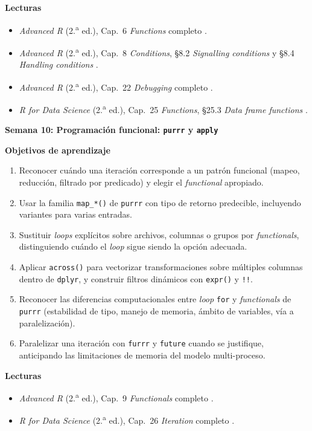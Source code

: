 \documentclass[11pt,letterpaper]{article}
\newcommand{\semana}[2]{%
  \bigskip%
  {\color{main}\Large\bfseries Semana #1: #2\par}%
  \smallskip%
}
\begin{document}
\medskip
\noindent\textbf{Lecturas}
\begin{itemize}[leftmargin=*, itemsep=1pt]
    \item \textit{Advanced R} (2.\textsuperscript{a} ed.), Cap.\ 6 \textit{Functions} completo \cite{wickham2019advr}.
    \item \textit{Advanced R} (2.\textsuperscript{a} ed.), Cap.\ 8 \textit{Conditions}, §8.2 \textit{Signalling conditions} y §8.4 \textit{Handling conditions} \cite{wickham2019advr}.
    \item \textit{Advanced R} (2.\textsuperscript{a} ed.), Cap.\ 22 \textit{Debugging} completo \cite{wickham2019advr}.
    \item \textit{R for Data Science} (2.\textsuperscript{a} ed.), Cap.\ 25 \textit{Functions}, §25.3 \textit{Data frame functions} \cite{wickham2023r4ds}.
\end{itemize}

\semana{10}{Programación funcional: \texttt{purrr} y \texttt{apply}}

\medskip
\noindent\textbf{Objetivos de aprendizaje}
\begin{enumerate}[leftmargin=*, itemsep=1pt]
    \item Reconocer cuándo una iteración corresponde a un patrón funcional (mapeo, reducción, filtrado por predicado) y elegir el \textit{functional} apropiado.
    \item Usar la familia \texttt{map\_*()} de \texttt{purrr} con tipo de retorno predecible, incluyendo variantes para varias entradas.
    \item Sustituir \textit{loops} explícitos sobre archivos, columnas o grupos por \textit{functionals}, distinguiendo cuándo el \textit{loop} sigue siendo la opción adecuada.
    \item Aplicar \texttt{across()} para vectorizar transformaciones sobre múltiples columnas dentro de \texttt{dplyr}, y construir filtros dinámicos con \texttt{expr()} y \texttt{!!}.
    \item Reconocer las diferencias computacionales entre \textit{loop} \texttt{for} y \textit{functionals} de \texttt{purrr} (estabilidad de tipo, manejo de memoria, ámbito de variables, vía a paralelización).
    \item Paralelizar una iteración con \texttt{furrr} y \texttt{future} cuando se justifique, anticipando las limitaciones de memoria del modelo multi-proceso.
\end{enumerate}

\medskip
\noindent\textbf{Lecturas}
\begin{itemize}[leftmargin=*, itemsep=1pt]
    \item \textit{Advanced R} (2.\textsuperscript{a} ed.), Cap.\ 9 \textit{Functionals} completo \cite{wickham2019advr}.
    \item \textit{R for Data Science} (2.\textsuperscript{a} ed.), Cap.\ 26 \textit{Iteration} completo \cite{wickham2023r4ds}.
\end{itemize}
\end{document}
